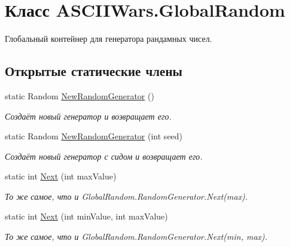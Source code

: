 \hypertarget{class_a_s_c_i_i_wars_1_1_global_random}{}\section{Класс A\+S\+C\+I\+I\+Wars.\+Global\+Random}
\label{class_a_s_c_i_i_wars_1_1_global_random}


Глобальный контейнер для генератора рандамных чисел.  


\subsection*{Открытые статические члены}
\begin{DoxyCompactItemize}
\item 
\hypertarget{class_a_s_c_i_i_wars_1_1_global_random_ad40c313d502809aad3398da0e8d1d8e6}{}\label{class_a_s_c_i_i_wars_1_1_global_random_ad40c313d502809aad3398da0e8d1d8e6} 
static Random \hyperlink{class_a_s_c_i_i_wars_1_1_global_random_ad40c313d502809aad3398da0e8d1d8e6}{New\+Random\+Generator} ()
\begin{DoxyCompactList}\small\item\em Создаёт новый генератор и возвращает его. \end{DoxyCompactList}\item 
\hypertarget{class_a_s_c_i_i_wars_1_1_global_random_a781ebf6e30b09d6b5ec1f97a2337564b}{}\label{class_a_s_c_i_i_wars_1_1_global_random_a781ebf6e30b09d6b5ec1f97a2337564b} 
static Random \hyperlink{class_a_s_c_i_i_wars_1_1_global_random_a781ebf6e30b09d6b5ec1f97a2337564b}{New\+Random\+Generator} (int seed)
\begin{DoxyCompactList}\small\item\em Создаёт новый генератор с сидом и возвращает его. \end{DoxyCompactList}\item 
\hypertarget{class_a_s_c_i_i_wars_1_1_global_random_a3cf1ee8b1aedce87e6364cf8b6e91156}{}\label{class_a_s_c_i_i_wars_1_1_global_random_a3cf1ee8b1aedce87e6364cf8b6e91156} 
static int \hyperlink{class_a_s_c_i_i_wars_1_1_global_random_a3cf1ee8b1aedce87e6364cf8b6e91156}{Next} (int max\+Value)
\begin{DoxyCompactList}\small\item\em То же самое, что и {\ttfamily Global\+Random.\+Random\+Generator.\+Next(max)}. \end{DoxyCompactList}\item 
\hypertarget{class_a_s_c_i_i_wars_1_1_global_random_ab59b93741055d3a3b6fae155946355f3}{}\label{class_a_s_c_i_i_wars_1_1_global_random_ab59b93741055d3a3b6fae155946355f3} 
static int \hyperlink{class_a_s_c_i_i_wars_1_1_global_random_ab59b93741055d3a3b6fae155946355f3}{Next} (int min\+Value, int max\+Value)
\begin{DoxyCompactList}\small\item\em То же самое, что и {\ttfamily Global\+Random.\+Random\+Generator.\+Next(min, max)}. \end{DoxyCompactList}\end{DoxyCompactItemize}

